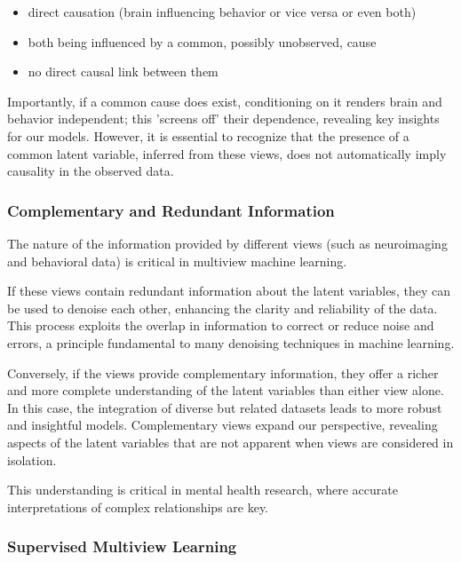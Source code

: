 \begin{itemize}
    \item direct causation (brain influencing behavior or vice versa or even both)
    \item both being influenced by a common, possibly unobserved, cause
    \item no direct causal link between them
\end{itemize}

Importantly, if a common cause does exist, conditioning on it renders brain and behavior independent; this 'screens off' their dependence, revealing key insights for our models\cite{reichenbach1956direction}.
However, it is essential to recognize that the presence of a common latent variable, inferred from these \gls{views}, does not automatically imply causality in the observed data.

\subsubsection{Complementary and Redundant Information}
The nature of the information provided by different \gls{views} (such as neuroimaging and behavioral data) is critical in multiview machine learning.

If these \gls{views} contain redundant information about the latent variables, they can be used to denoise each other, enhancing the clarity and reliability of the data.
This process exploits the overlap in information to correct or reduce noise and errors, a principle fundamental to many denoising techniques in machine learning.

Conversely, if the \gls{views} provide complementary information, they offer a richer and more complete understanding of the latent variables than either view alone.
In this case, the integration of diverse but related datasets leads to more robust and insightful models.
Complementary \gls{views} expand our perspective, revealing aspects of the latent variables that are not apparent when \gls{views} are considered in isolation.

This understanding is critical in mental health research, where accurate interpretations of complex relationships are key.


\subsubsection{Supervised Multiview Learning}

